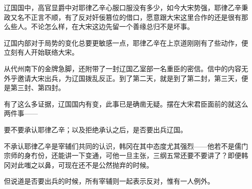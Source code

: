 辽国国中，高官显爵中对耶律乙辛心服口服没有多少，如今大宋势强，耶律乙辛秉政又名不正言不顺，有了反对奸佞篡位的借口，愿意跟大宋这里合作的还是很有那么些人。不论怎么样，在大宋这边先留一个善缘总归不是坏事。

辽国内部对于局势的变化总要更敏感一点，耶律乙辛在上京道刚刚有了些动作，便立刻有人开始联络大宋。

从代州南下的金牌急脚，还附带了一封辽国乙室部一名重臣的密信。信中的内容无外乎邀请大宋出兵，为辽国拨乱反正。到了第二天，就是到了第二封，第三天，便是第三封、第四封。

有了这么多证据，辽国国内有变，此事已是确凿无疑。摆在大宋君臣面前的就这么两件事——

要不要承认耶律乙辛；以及拒绝承认之后，是否要出兵辽国。

不承认耶律乙辛是宰辅们共同的认识，韩冈在其中态度尤其强烈——他若不是儒门宗师的身冇份，还能讲一下变通，可他一旦主张，三纲五常还要不要讲了？即便韩冈对此嗤之以鼻，可现在还不是公然抛弃的时候。

但说道是否要出兵的时候，所有宰辅则一起表示反对，惟有一人例外。
